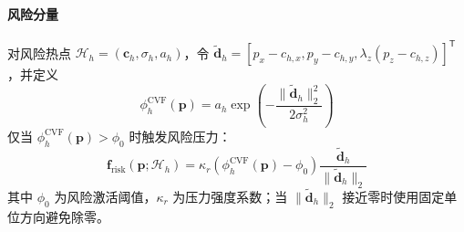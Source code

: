\paragraph{风险分量}
对风险热点 $\mathcal H_h=(\mathbf c_h,\sigma_h,a_h)$，令 $\widetilde{\mathbf d}_h=[p_x-c_{h,x},p_y-c_{h,y},\lambda_z(p_z-c_{h,z})]^\mathsf T$，并定义
\begin{equation}
    \phi_h^{\mathrm{CVF}}(\mathbf p)=
    a_h\exp\left(-\frac{\|\widetilde{\mathbf d}_h\|_2^2}{2\sigma_h^2}\right)
    \label{eq:risk-hotspot}
\end{equation}
仅当 $\phi_h^{\mathrm{CVF}}(\mathbf p)>\phi_0$ 时触发风险压力：
\begin{equation}
    \mathbf f_{\mathrm{risk}}(\mathbf p;\mathcal H_h)=
    \kappa_r(\phi_h^{\mathrm{CVF}}(\mathbf p)-\phi_0)
    \frac{\widetilde{\mathbf d}_h}{\|\widetilde{\mathbf d}_h\|_2}
    \label{eq:risk-pressure}
\end{equation}
其中 $\phi_0$ 为风险激活阈值，$\kappa_r$ 为压力强度系数；当 $\|\widetilde{\mathbf d}_h\|_2$ 接近零时使用固定单位方向避免除零。

